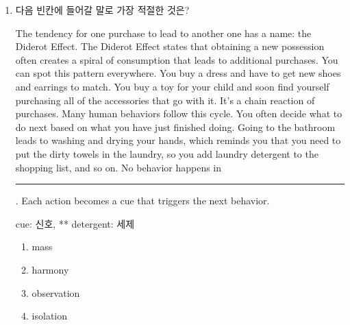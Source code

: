 \documentclass[9pt, a4paper, twocolumn]{oblivoir}
\begin{document}
\begin{enumerate}
        Creativity is a step further on from imagination. Imagination
can be an entirely private process of internal consciousness.
You might be lying motionless on your bed in a fever of
imagination and no one would ever know. Private imaginings
may have no outcomes in the world at all. Creativity does.
Being creative involves doing something. It would be odd to
describe as creative someone who never did anything. To call
somebody creative suggests they are actively producing
something in a deliberate way. People are not creative in the
abstract; they are creative in something: in mathematics, in
engineering, in writing, in music, in business, in whatever.
Creativity involves putting your imagination to work. In a
sense, creativity is applied imagination.
\begin{flushright}
    {\small * deliberate: 의도적인 ** odd: 이상한}
\end{flushright}
    \begin{enumerate}
        \item the various meanings of imagination
        \item creativity as the realization of imagination
        \item diverse ways to enhance creativity of people 
        \item effects of a creative attitude on academic achievement
    \end{enumerate}

\pagebreak

        \item 다음 빈칸에 들어갈 말로 가장 적절한 것은? 

        The tendency for one purchase to lead to another one has
a name: the Diderot Effect. The Diderot Effect states that
obtaining a new possession often creates a spiral of
consumption that leads to additional purchases. You can spot
this pattern everywhere. You buy a dress and have to get
new shoes and earrings to match. You buy a toy for your
child and soon find yourself purchasing all of the accessories
that go with it. It’s a chain reaction of purchases. Many
human behaviors follow this cycle. You often decide what to
do next based on what you have just finished doing. Going
to the bathroom leads to washing and drying your hands,
which reminds you that you need to put the dirty towels in
the laundry, so you add laundry detergent to the shopping
list, and so on. No behavior happens in \rule{1cm}{0.1mm}. Each
action becomes a cue that triggers the next behavior.
\begin{flushright}
    {\small * cue: 신호, ** detergent: 세제}
\end{flushright}
    \begin{enumerate}
        \item mass
        \item harmony
        \item observation
        \item isolation %
    \end{enumerate}


\end{enumerate}
\end{document}

